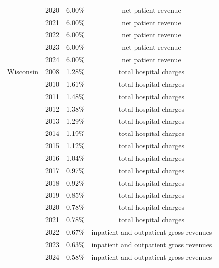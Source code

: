 \begin{longtable}{llcc}
 & 2020 & 6.00\% & net patient revenue \\[0pt]
 & 2021 & 6.00\% & net patient revenue \\[0pt]
 & 2022 & 6.00\% & net patient revenue \\[0pt]
 & 2023 & 6.00\% & net patient revenue \\[0pt]
 & 2024 & 6.00\% & net patient revenue \\[0pt]
\midrule
Wisconsin & 2008 & 1.28\% & total hospital charges \\[0pt]
 & 2010 & 1.61\% & total hospital charges \\[0pt]
 & 2011 & 1.48\% & total hospital charges \\[0pt]
 & 2012 & 1.38\% & total hospital charges \\[0pt]
 & 2013 & 1.29\% & total hospital charges \\[0pt]
 & 2014 & 1.19\% & total hospital charges \\[0pt]
 & 2015 & 1.12\% & total hospital charges \\[0pt]
 & 2016 & 1.04\% & total hospital charges \\[0pt]
 & 2017 & 0.97\% & total hospital charges \\[0pt]
 & 2018 & 0.92\% & total hospital charges \\[0pt]
 & 2019 & 0.85\% & total hospital charges \\[0pt]
 & 2020 & 0.78\% & total hospital charges \\[0pt]
 & 2021 & 0.78\% & total hospital charges \\[0pt]
 & 2022 & 0.67\% & inpatient and outpatient gross revenues \\[0pt]
 & 2023 & 0.63\% & inpatient and outpatient gross revenues \\[0pt]
 & 2024 & 0.58\% & inpatient and outpatient gross revenues \\[0pt]
\bottomrule
\end{longtable}

